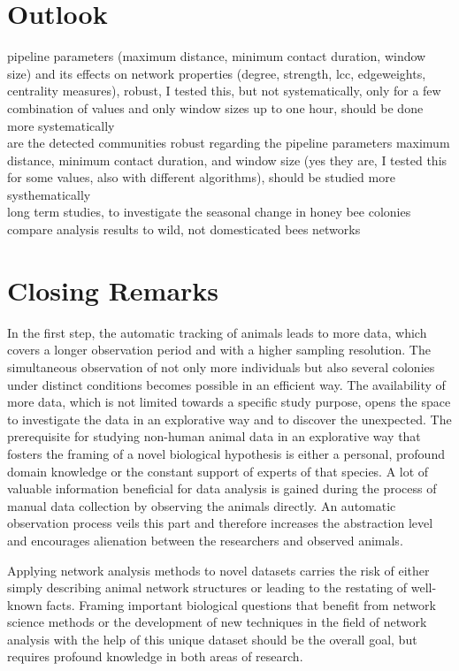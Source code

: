 \section{Outlook}

pipeline parameters (maximum distance, minimum contact duration, window size) and its effects on network properties (degree, strength, lcc, edgeweights, centrality measures), robust, I tested this, but not systematically, only for a few combination of values and only window sizes up to one hour, should be done more systematically\\

are the detected communities robust regarding the pipeline parameters maximum distance, minimum contact duration, and window size (yes they are, I tested this for some values, also with different algorithms), should be studied more systhematically\\

long term studies, to investigate the seasonal change in honey bee colonies\\

compare analysis results to wild, not domesticated bees networks\\

\section{Closing Remarks}
In the first step, the automatic tracking of animals leads to more data, which covers a longer observation period and with a higher sampling resolution. The simultaneous observation of not only more individuals but also several colonies under distinct conditions becomes possible in an efficient way.
The availability of more data, which is not limited towards a specific study purpose, opens the space to investigate the data in an explorative way and to discover the unexpected.
The prerequisite for studying non-human animal data in an explorative way that fosters the framing of a novel biological hypothesis is either a personal, profound domain knowledge or the constant support of experts of that species.
A lot of valuable information beneficial for data analysis is gained during the process of manual data collection by observing the animals directly. An automatic observation process veils this part and therefore increases the abstraction level and encourages alienation between the researchers and observed animals.

Applying network analysis methods to novel datasets carries the risk of either simply describing animal network structures or leading to the restating of well-known facts. Framing important biological questions that benefit from network science methods or the development of new techniques in the field of network analysis with the help of this unique dataset should be the overall goal, but requires profound knowledge in both areas of research.